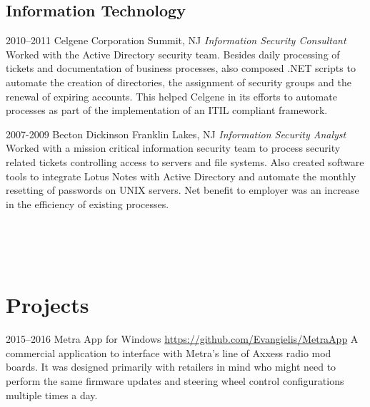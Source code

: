 \documentclass[]{friggeri-cv} %
\begin{document}
\subsection{Information Technology}

\begin{entrylist}

\entry
{2010--2011}
{Celgene Corporation}
{Summit, NJ}
{\emph{Information Security Consultant} \\
Worked with the Active Directory security team.  Besides daily processing of tickets and documentation of business processes, also composed .NET scripts to automate the creation of directories, the assignment of security groups and the renewal of expiring accounts.   This helped Celgene in its efforts to automate processes as part of the implementation of an ITIL compliant framework. }


\entry
{2007-2009}
{Becton Dickinson}
{Franklin Lakes, NJ}
{\emph{Information Security Analyst} \\
Worked with a mission critical information security team to process security related tickets controlling access to servers and file systems.  Also created software tools to integrate Lotus Notes with Active Directory and automate the monthly resetting of passwords on UNIX servers.  Net benefit to employer was an increase in the efficiency of existing processes. }

\\ \\ \\
\end{entrylist}



\section{Projects}

\begin{entrylist}


\entry
{2015--2016}
{Metra App for Windows}
{\href{https://github.com/Evangielis/MetraApp}{https://github.com/Evangielis/MetraApp}}
{A commercial application to interface with Metra's line of Axxess radio mod boards.  It was designed primarily with retailers in mind who might need to perform the same firmware updates and steering wheel control configurations multiple times a day.}
\end{entrylist}
\end{document}
